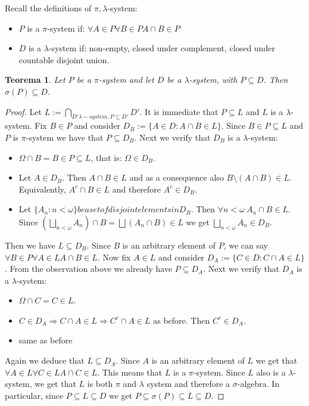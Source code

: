 \documentclass[11pt,a4paper]{article}
\newtheorem{theorem}{Teorema}
\theoremstyle{definition}
\theoremstyle{remark}
\begin{document}
Recall the definitions of $\pi,\lambda$-system:
\begin{itemize}
	\item $P$ is a $\pi$-system if: $\forall A \in P \forall B \in P A \cap B \in P$
	\item $D$ is a $\lambda$-system if: non-empty, closed under complement, closed under countable disjoint union.
\end{itemize}

\begin{theorem}

	Let $P$ be a $\pi$-system and let $D$ be a $\lambda$-system, with $P \subseteq D$. Then $\sigma(P) \subseteq D$.

\end{theorem}

\begin{proof}

	Let $L := \bigcap_{D' \lambda-system, P \subseteq D'} D'$. It is immediate that $P \subseteq L$ and $L$ is a $\lambda$-system.
	Fix $B \in P$ and consider $D_B := \{A \in D: A \cap B \in L\}$.
	Since $B \in P \subseteq L$ and $P$ is $\pi$-system we have that $P \subseteq D_B$.
	Next we verify that $D_B$ is a $\lambda$-system:
	\begin{itemize}
		\item $\Omega \cap B = B \in P \subseteq L$, that is: $\Omega \in D_B$.
		\item Let $A \in D_B$. Then $A \cap B \in L$ and as a consequence also $B \setminus (A \cap B) \in L$.
			Equivalently, $A^c \cap B \in L$ and therefore $A^c \in D_B$.
		\item Let $\{A_n : n < \omega\} be a set of disjoint elements in D_B$. Then $\forall n< \omega \ A_n \cap B \in L$.
			Since $(\bigsqcup_{n < \omega} A_n) \cap B = \bigsqcup (A_n \cap B) \in L $ we get $\bigsqcup_{n<\omega} A_n \in D_B$. 
	\end{itemize}

	Then we have $L \subseteq D_B$.
	Since $B$ is an arbitrary element of $P$, we can say $\forall B \in P \forall A \in L A \cap B \in L$.
	Now fix $A \in L$ and consider $D_A := \{C \in D: C \cap A \in L\}$.
	From the observation above we already have $P \subseteq D_A$.
	Next we verify that $D_A$ is a $\lambda$-system:
	\begin{itemize}
		\item $\Omega \cap C = C \in L$.
		\item $C \in D_A \Rightarrow C \cap A \in L \Rightarrow C^c \cap A \in L$ as before. Then $C^c \in D_A$.
		\item same as before
	\end{itemize}

	Again we deduce that $L \subseteq D_A$.
	Since $A$ is an arbitrary element of $L$ we get that $\forall A \in L \forall C \in L A \cap C \in L$.
	This means that $L$ is a $\pi$-system.
	Since $L$ also is a $\lambda$-system, we get that $L$ is both $\pi$ and $\lambda$ system and therefore a $\sigma$-algebra.
	In particular, since $P \subseteq L \subseteq D$ we get $P \subseteq \sigma(P) \subseteq L \subseteq D$.
\end{proof}
\end{document}
